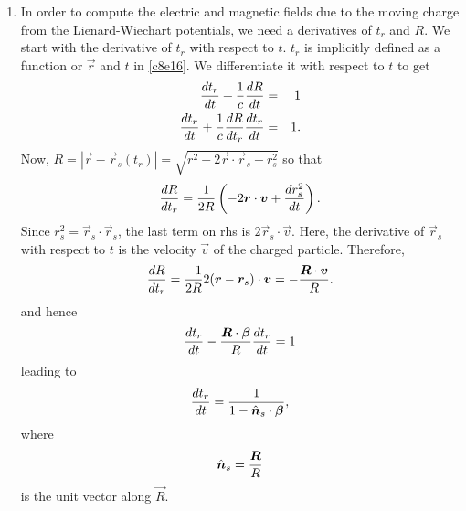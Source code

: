 \begin{enumerate}
\item In order to compute the electric and magnetic fields due to the moving
charge from the Lienard-Wiechart potentials, we need a derivatives of $t_r$ and
$R$. We start with the derivative of $t_r$ with respect to $t$. $t_r$ is 
implicitly defined as a function or $\vec{r}$ and $t$ in \eqref{c8e16}. We
differentiate it with respect to $t$ to get
\begin{eqnarray*}
\frac{d{t_r}}{d{t}} + \frac{1}{c}\frac{d{R}}{d{t}} &=& 1 \\
\frac{d{t_r}}{d{t}} + \frac{1}{c}\frac{d{R}}{d{t_r}}\frac{d{t_r}}{d{t}} &=& 1.
\end{eqnarray*}
Now, $R = |\vec{r} - \vec{r}_s(t_r)| = \sqrt{r^2-2\vec{r}\cdot\vec{r}_s+r_s^2}$
so that
\[
\frac{d{R}}{d{t_r}} = \frac{1}{2R}\left(-2\bm{r}\cdot\bm{v} + \frac{d{r_s^2}}{d{t}}\right).
\]
Since $r_s^2 = \vec{r}_s\cdot\vec{r}_s$, the last term on rhs is $2\vec{r}_s
\cdot\vec{v}$. Here, the derivative of $\vec{r}_s$ with respect to $t$ is the
velocity $\vec{v}$ of the charged particle. Therefore,
\[
\frac{d{R}}{d{t_r}} = \frac{-1}{2R}2(\bm{r} - \bm{r}_s)\cdot\bm{v} = 
-\frac{\bm{R}\cdot\bm{v}}{R}.
\]
and hence
\[
\frac{d{t_r}}{d{t}} - \frac{\bm{R}\cdot\bm{\beta}}{R}\frac{d{t_r}}{d{t}} = 1
\]
leading to
\begin{equation}\label{c8e25}
\frac{d{t_r}}{d{t}} = \frac{1}{1 - \hat{\bm{n}}_s\cdot\bm{\beta}},
\end{equation}
where
\begin{equation}\label{c8e26}
\hat{\bm{n}}_s = \frac{\bm{R}}{R}
\end{equation}
is the unit vector along $\vec{R}$.


\end{enumerate}
